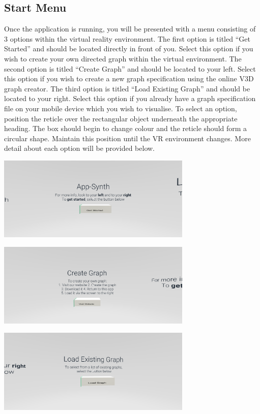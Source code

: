 \documentclass[english]{article}
\begin{document}
\subsection{Start Menu}
Once the application is running, you will be presented with a menu consisting of 3 options within the virtual reality environment. The first option is titled “Get Started” and should be located directly in front of you. Select this option if you wish to create your own directed graph within the virtual environment. The second option is titled “Create Graph” and should be located to your left. Select this option if you wish to create a new graph specification using the online V3D graph creator. The third option is titled “Load Existing Graph” and should be located to your right. Select this option if you already have a graph specification file on your mobile device which you wish to visualise. To select an option, position the reticle over the rectangular object underneath the appropriate heading. The box should begin to change colour and the reticle should form a circular shape. Maintain this position until the VR environment changes. More detail about each option will be provided below.

\includegraphics[width=350px]{Images/GetStartedMenu.PNG}

\includegraphics[width=350px]{Images/CreateGraphMenu.PNG}

\includegraphics[width=350px]{Images/LoadExistingGraphMenu.PNG}
\end{document}
